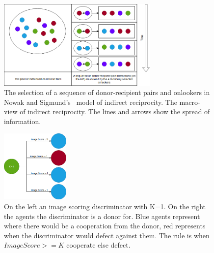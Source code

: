 \documentclass[]{final_report}
\begin{document}
\begin{figure}
	\center
	\includegraphics[width=0.7\textwidth]{Onlookers.png}
	\caption{The selection of a sequence of donor-recipient pairs and onlookers in Nowak and Sigmund's~\cite{evol_indirect_image} model of indirect reciprocity. The macro-view of indirect reciprocity. The lines and arrows show the spread of information.}
	\label{fig:onlookers}
\end{figure}
\begin{figure}
	\center
	\includegraphics[width=0.3\textwidth]{Image_Scoring.png}
	\caption{On the left an image scoring discriminator with K=1. On the right the agents the discriminator is a donor for. Blue agents represent where there would be a cooperation from the donor, red represents when the discriminator would defect against them. The rule is when $Image Score >= K$ cooperate else defect.}
	\label{fig:image_discriminator}
\end{figure}
\end{document}
